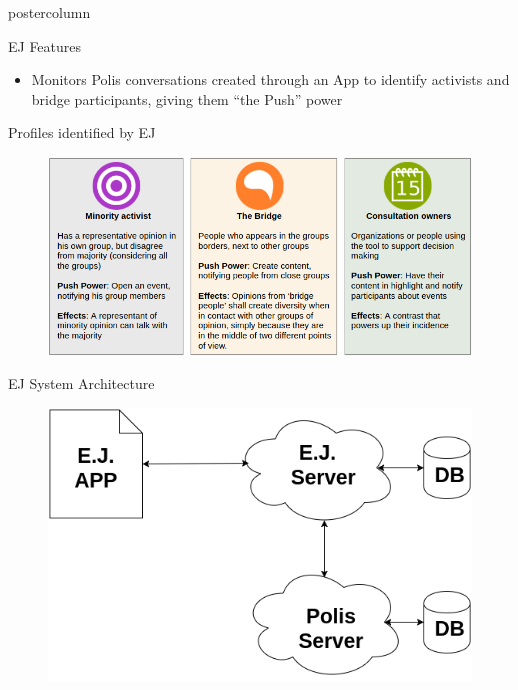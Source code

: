 \documentclass[final,hyperref={pdfpagelabels=false}]{beamer}
\begin{document}
\begin{frame}
\begin{columns}
\begin{column}{.49\textwidth}
\begin{beamercolorbox}[center,wd=\textwidth]{postercolumn}
\begin{minipage}[T]{.95\textwidth}
{\begin{block}{EJ Features}
\begin{itemize}
    \item Monitors Polis conversations created through an App
    to identify activists and bridge participants, giving them ``the Push''
    power
  \end{itemize}

\end{block}

\begin{block}{Profiles identified by EJ}
  \begin{figure}
    \begin{center}
      \includegraphics[scale=1.45]{../images/userprofiles.png}
      \caption{}
      \label{fig:user-profiles}
    \end{center}
  \end{figure}
\end{block}

\begin{block}{EJ System Architecture}

  \begin{figure}
    \begin{center}
      \includegraphics[scale=1.3]{../images/polis4.png}
      \label{fig:architecture}
    \end{center}
  \end{figure}


\end{block}}
\end{minipage}
\end{beamercolorbox}
\end{column}
\end{columns}
\end{frame}
\end{document}
